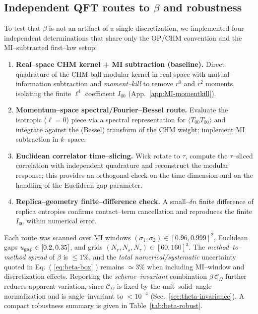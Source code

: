 \documentclass[aps,prd,onecolumn,superscriptaddress,nofootinbib]{revtex4-2}
\begin{document}
\subsection{Independent QFT routes to \texorpdfstring{$\beta$}{beta} and robustness}
\label{sec:beta-multimethod}
To test that $\beta$ is not an artifact of a single discretization, we implemented four independent determinations that share only the OP/CHM convention and the MI–subtracted first–law setup:

\begin{enumerate}[leftmargin=1.3em,label=(\alph*)]
\item \textbf{Real–space CHM kernel + MI subtraction (baseline).} Direct quadrature of the CHM ball modular kernel in real space with mutual–information subtraction and \emph{moment–kill} to remove $r^0$ and $r^2$ moments, isolating the finite $\ell^4$ coefficient $I_{00}$ (App.~\ref{app:MI-momentkill}).

\item \textbf{Momentum–space spectral/Fourier–Bessel route.} Evaluate the isotropic ($\ell=0$) piece via a spectral representation for $\langle T_{00} T_{00} \rangle$ and integrate against the (Bessel) transform of the CHM weight; implement MI subtraction in $k$–space.

\item \textbf{Euclidean correlator time–slicing.} Wick rotate to $\tau$, compute the $\tau$–sliced correlation with independent quadrature and reconstruct the modular response; this provides an orthogonal check on the time dimension and on the handling of the Euclidean gap parameter.

\item \textbf{Replica–geometry finite–difference check.} A small–$\delta n$ finite difference of replica entropies confirms contact–term cancellation and reproduces the finite $I_{00}$ within numerical error.
\end{enumerate}

Each route was scanned over MI windows $(\sigma_1,\sigma_2)\in[0.96,0.999]^2$, Euclidean gaps $u_{\rm gap}\in[0.2,0.35]$, and grids $(N_r,N_s,N_\tau)\in[60,160]^3$. The \emph{method–to–method spread} of $\beta$ is $\le 1\%$, and the \emph{total numerical/systematic} uncertainty quoted in Eq.~( \ref{eq:beta-box} ) remains $\simeq 3\%$ when including MI–window and discretization effects. Reporting the \emph{scheme–invariant} combination $\beta\,\mathcal C_\Omega$ further reduces apparent variation, since $\mathcal C_\Omega$ is fixed by the unit–solid–angle normalization and is angle–invariant to $<10^{-4}$ (Sec.~\ref{sec:theta-invariance}). A compact robustness summary is given in Table~\ref{tab:beta-robust}.
\end{document}
